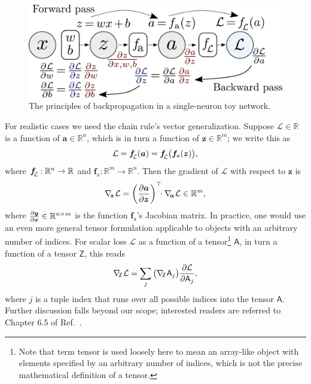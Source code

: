 \documentclass[11pt, a4paper]{article}
\renewcommand{\vec}[1]{\bm{#1}}
\newcommand{\tensor}[1]{\mathsf{#1}}
\renewcommand{\grad}{\nabla}
\newcommand{\z}{\vec{z}}
\renewcommand{\a}{\vec{a}}
\newcommand{\subgrad}[1]{\grad_{\mspace{-4mu}#1}\mspace{1mu}} %
\begin{document}
\begin{figure}[htb!]
    \centering
    \includegraphics[width=0.80\linewidth]{vector/backprop-toy.pdf}
    \vspace{-3mm}
    \caption{The principles of backpropagation in a single-neuron toy network.}
    \label{fig:backprop-toy}
\end{figure}

For realistic cases we need the chain rule's vector generalization.
Suppose $ \mathcal{L} \in \mathbb{R} $ is a function of $ \a \in \mathbb{R}^{n} $, which is in turn a function of $ \z \in \mathbb{R}^{m} $; we write this as
\begin{equation*}
    \mathcal{L} = \vec{f}_{\raisebox{-0.4ex}{\scalebox{0.7}{$\mspace{-3mu} \mathcal{L}$}}} (\vec{a}) = \vec{f}_{\raisebox{-0.4ex}{\scalebox{0.7}{$\mspace{-3mu} \mathcal{L}$}}} \big( \vec{f}_{\text{a}} (\z) \big),
\end{equation*}
where $ \vec{f}_{\raisebox{-0.4ex}{\scalebox{0.7}{$\mspace{-3mu} \mathcal{L}$}}} : \mathbb{R}^{n} \to \mathbb{R} $ and $ \vec{f}_{\text{a}} : \mathbb{R}^{m} \to \mathbb{R}^{n} $.
Then the gradient of $ \mathcal{L} $ with respect to $ \z $ is
\begin{equation*}
    \subgrad{\z} \mathcal{L} = \left( \pdv{\a}{\z} \right)^{\top} \mspace{-7mu} \cdot \subgrad{\a} \mathcal{L} \in \mathbb{R}^{m},
\end{equation*}
where $ \pdv{\vec{y}}{\vec{x}} \in \mathbb{R}^{n \times m} $ is the function $ \vec{f}_{\text{a}} $'s Jacobian matrix.
In practice, one would use an even more general tensor formulation applicable to objects with an arbitrary number of indices.
For scalar loss $ \mathcal{L} $ as a function of a tensor\footnote{Note that term tensor is used loosely here to mean an array-like object with elements specified by an arbitrary number of indices, which is not the precise mathematical definition of a tensor.} $ \tensor{A} $, in turn a function of a tensor $ \tensor{Z} $, this reads
\begin{equation*}
    \subgrad{\tensor{Z}} \mathcal{L} = \sum_{j} \big( \subgrad{\tensor{Z}} \tensor{A}_{j} \big) \pdv{\mathcal{L}}{\tensor{A}_{j}},
\end{equation*}
where $ j $ is a tuple index that runs over all possible indices into the tensor $ \tensor{A} $.
Further discussion falls beyond our scope; interested readers are referred to Chapter 6.5 of Ref.~\cite{goodfellow}.
\end{document}
